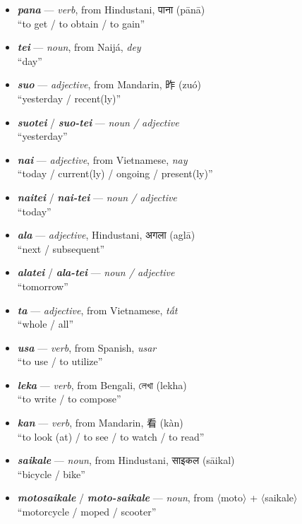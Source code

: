 \documentclass[a4paper]{article}
\begin{document}
\begin{itemize}
	\item \textbf{\textit{pana}} — \textit{verb}, from Hindustani, {\hmfont पाना} (pānā) \\ ``to get / to obtain / to gain''
	\item \textbf{\textit{tei}} — \textit{noun}, from Naijá, \textit{dey} \\ ``day''
	\item \textbf{\textit{suo}} — \textit{adjective}, from Mandarin, 昨 (zuó) \\ ``yesterday / recent(ly)''
	\item \textbf{\textit{suotei}} / \textbf{\textit{suo-tei}} — \textit{noun /  adjective} \\ ``yesterday''
	\item \textbf{\textit{nai}} — \textit{adjective}, from Vietnamese, \textit{nay} \\ ``today / current(ly) / ongoing / present(ly)''
	\item \textbf{\textit{naitei}} / \textbf{\textit{nai-tei}} — \textit{noun /  adjective} \\ ``today''
	\item \textbf{\textit{ala}} — \textit{adjective}, Hindustani, {\hmfont अगला} (aglā) \\ ``next / subsequent''
	\item \textbf{\textit{alatei}} / \textbf{\textit{ala-tei}} — \textit{noun /  adjective} \\ ``tomorrow''
	\item \textbf{\textit{ta}} — \textit{adjective}, from Vietnamese, \textit{tất} \\``whole / all''
	\item \textbf{\textit{usa}} — \textit{verb}, from Spanish, \textit{usar} \\``to use /  to utilize''
	\item \textbf{\textit{leka}} — \textit{verb}, from Bengali, {\benfont লেখা} (lekha) \\``to write /  to compose''
	\item \textbf{\textit{kan}} — \textit{verb}, from Mandarin, 看 (kàn) \\``to look (at) / to see / to watch / to read''
	\item \textbf{\textit{saikale}}  — \textit{noun}, from Hindustani, {\hmfont साइकल} (sāikal) \\``bicycle / bike''
	\item \textbf{\textit{motosaikale}} / \textbf{\textit{moto-saikale}}  — \textit{noun}, from $\langle$moto$\rangle$ + $\langle$saikale$\rangle$ \\``motorcycle / moped / scooter''

\end{itemize}
\end{document}
